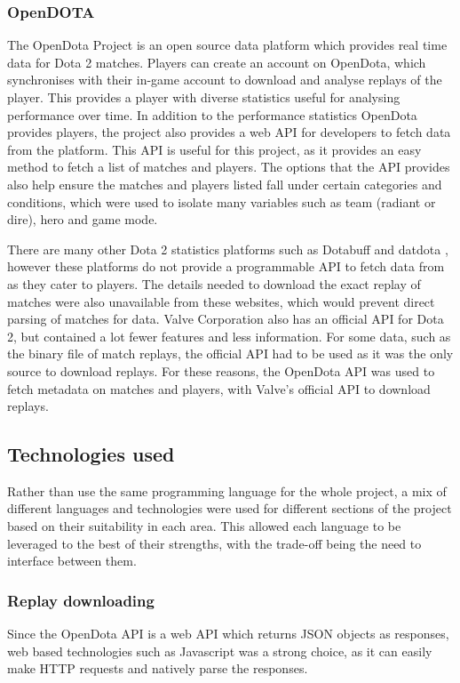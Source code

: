 \documentclass[Report.tex]{subfiles}
\begin{document}
\subsubsection{OpenDOTA}
The OpenDota Project \cite{opendota} is an open source data platform which provides real time data for Dota 2 matches. Players can create an account on OpenDota, which synchronises with their in-game account to download and analyse replays of the player. This provides a player with diverse statistics useful for analysing performance over time. In addition to the performance statistics OpenDota provides players, the project also provides a web API for developers to fetch data from the platform. This API is useful for this project, as it provides an easy method to fetch a list of matches and players. The options that the API provides also help ensure the matches and players listed fall under certain categories and conditions, which were used to isolate many variables such as team (radiant or dire), hero and game mode. 

There are many other Dota 2 statistics platforms such as Dotabuff \cite{dotabuff} and datdota \cite{datdota}, however these platforms do not provide a programmable API to fetch data from as they cater to players. The details needed to download the exact replay of matches were also unavailable from these websites, which would prevent direct parsing of matches for data. Valve Corporation also has an official API for Dota 2, but contained a lot fewer features and less information. For some data, such as the binary file of match replays, the official API had to be used as it was the only source to download replays. For these reasons, the OpenDota API was used to fetch metadata on matches and players, with Valve's official API to download replays. 


\subsection{Technologies used}
Rather than use the same programming language for the whole project, a mix of different languages and technologies were used for different sections of the project based on their suitability in each area. This allowed each language to be leveraged to the best of their strengths, with the trade-off being the need to interface between them.
 
\subsubsection{Replay downloading}
Since the OpenDota API is a web API which returns JSON objects as responses, web based technologies such as Javascript was a strong choice, as it can easily make HTTP requests and natively parse the responses. 
\end{document}
